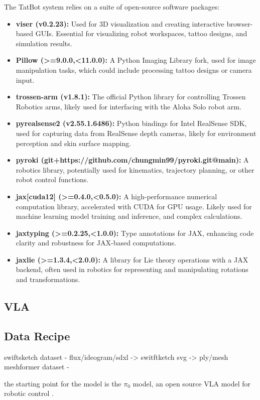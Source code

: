 \documentclass[11pt]{article}
\begin{document}
The TatBot system relies on a suite of open-source software packages:
\begin{itemize}
    \item \textbf{viser (v0.2.23):} Used for 3D visualization and creating interactive browser-based GUIs. Essential for visualizing robot workspaces, tattoo designs, and simulation results.
    \item \textbf{Pillow (>=9.0.0,<11.0.0):} A Python Imaging Library fork, used for image manipulation tasks, which could include processing tattoo designs or camera input.
    \item \textbf{trossen-arm (v1.8.1):} The official Python library for controlling Trossen Robotics arms, likely used for interfacing with the Aloha Solo robot arm.
    \item \textbf{pyrealsense2 (v2.55.1.6486):} Python bindings for Intel RealSense SDK, used for capturing data from RealSense depth cameras, likely for environment perception and skin surface mapping.
    \item \textbf{pyroki (git+https://github.com/chungmin99/pyroki.git@main):} A robotics library, potentially used for kinematics, trajectory planning, or other robot control functions.
    \item \textbf{jax[cuda12] (>=0.4.0,<0.5.0):} A high-performance numerical computation library, accelerated with CUDA for GPU usage. Likely used for machine learning model training and inference, and complex calculations.
    \item \textbf{jaxtyping (>=0.2.25,<1.0.0):} Type annotations for JAX, enhancing code clarity and robustness for JAX-based computations.
    \item \textbf{jaxlie (>=1.3.4,<2.0.0):} A library for Lie theory operations with a JAX backend, often used in robotics for representing and manipulating rotations and transformations.
\end{itemize}

\subsection{VLA}

\subsection{Data Recipe}

swiftsketch dataset - flux/ideogram/sdxl -> switftketch svg -> ply/mesh
meshformer dataset -

the starting point for the model is the $\pi_0$ model, an open source VLA model for robotic control \cite{Black2024pi0}.
\end{document}
